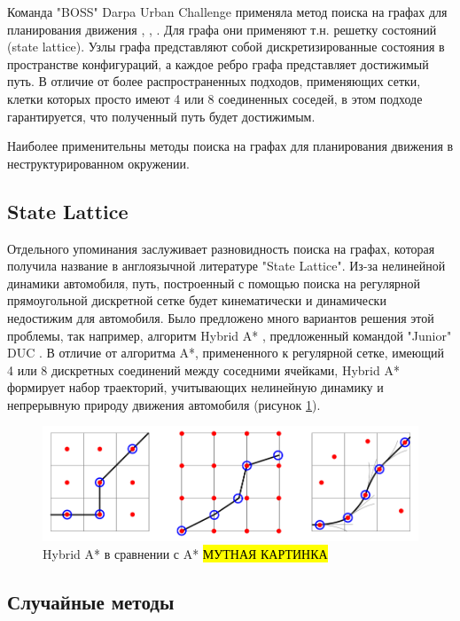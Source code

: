 Команда "BOSS" Darpa Urban Challenge применяла метод поиска на графах для планирования движения \cite{darpa_boss},
\cite{darpa_boss_2}, \cite{darpa_boss_3}. Для графа они применяют т.н. решетку состояний (state lattice). Узлы
графа представляют собой дискретизированные состояния в пространстве конфигураций, а каждое ребро графа представляет
достижимый путь. В отличие от более распространенных подходов, применяющих сетки, клетки которых просто имеют 4
или 8 соединенных соседей, в этом подходе гарантируется, что полученный путь будет достижимым.

Наиболее применительны методы поиска на графах для планирования движения в неструктурированном окружении.

\subsection{State Lattice}
Отдельного упоминания заслуживает разновидность поиска на графах, которая получила название в англоязычной
литературе "State Lattice". Из-за нелинейной динамики автомобиля, путь, построенный с помощью поиска на
регулярной прямоугольной дискретной сетке будет кинематически и динамически недостижим для автомобиля.
Было предложено много вариантов решения этой проблемы, так например, алгоритм Hybrid A*
\cite{motion_planning_hybrid_a_star}, предложенный командой "Junior" DUC \cite{darpa_junior}.
В отличие от алгоритма A*, примененного к регулярной сетке, имеющий 4 или 8 дискретных соединений между соседними
ячейками, Hybrid A* формирует набор траекторий, учитывающих нелинейную динамику и непрерывную природу движения
автомобиля (рисунок \ref{img:hybrid_a_star}).

\begin{figure}[h]
    \centering
    \includegraphics[width=0.7\linewidth]{images/hybrid_a_star}
    \caption{Hybrid A* в сравнении с A* \cite{motion_planning_hybrid_a_star}
    \hl{МУТНАЯ КАРТИНКА}}
    \label{img:hybrid_a_star}
\end{figure}

\subsection{Случайные методы}

